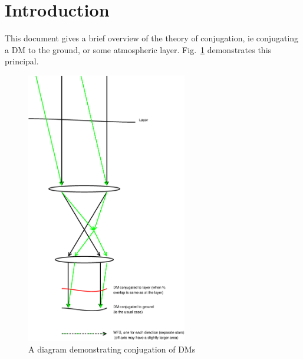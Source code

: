 \documentclass{article}
\begin{document}

\renewcommand{\dasptitle}{DM conjugation introduction}
\renewcommand{\daspdocno}{AOSIM-DMC-UoD-001}
\renewcommand{\releasedate}{070329}

\section{Introduction}
This document gives a brief overview of the theory of conjugation, ie
conjugating a DM to the ground, or some atmospheric layer.
Fig.~\ref{fig:conjugation} demonstrates this principal.  


\begin{figure}
\includegraphics[width=7cm]{conjugation.eps}
\caption{A diagram demonstrating conjugation of DMs}
\label{fig:conjugation}
\end{figure}


\printindex
\end{document}
